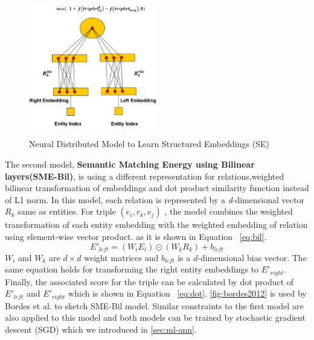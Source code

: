     \begin{figure}[h!]
  \caption{Neural Distributed Model to Learn Structured Embeddings (SE)}
  \centering
    \includegraphics[width=0.5\textwidth]{bordes2011.eps}
    \label{fig:bordes2011}
\end{figure} 
    The second model, \textbf{Semantic Matching Energy using Bilinear layers(SME-Bil)}, 
    is using a different representation for relations,weighted bilinear
    transformation of embeddings and  dot product similarity function instead of L1 norm. 
    In this model, each relation is represented by a \textit{d}-dimensional vector $R_{k}$ same as entities. 
    For triple $(e_{i},r_{k} , e_{j} )$ , the model combines the weighted transformation of each entity embedding with 
    the weighted embedding of relation using element-wise vector product. as it is shown in Equation ~\eqref{eq:bil}.
    \begin{equation}
    \label{eq:bil} E'_{left} = (W_{i} E_{i}) \odot (W_{k} R_{k}) + b_{left}
    \end{equation}
    $W_{i}$ and $W_{k}$ are $d \times d$ weight matrices and $b_{left}$ is a $d$-dimensional bias vector. 
    The same equation holds for transforming the right entity embeddings to $E'_{right}$. Finally, the associated score for the triple
     can be calculated by dot product of $E'_{left}$ and $E'_{right}$ which is
     shown in Equation ~\ref{eq:dot}. \autoref{fig:bordes2012} is used by Bordes
     et al. to sketch SME-Bil model. Similar constraints to the first model are also applied to this model and 
     both models can be trained by stochastic gradient descent (SGD) which we
     introduced in \autoref{sec:ml-ann}. 
    
